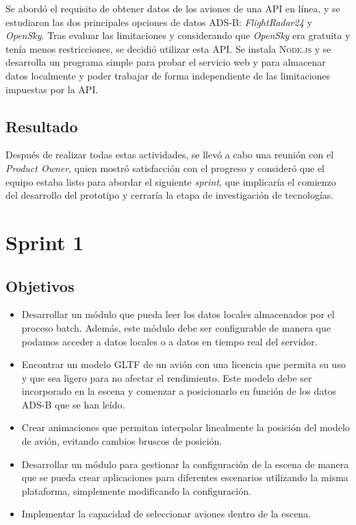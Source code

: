 \documentclass[a4paper, 11pt]{book}
\begin{document}
Se abordó el requisito de obtener datos de los aviones de una \textsc{API} en línea, y se estudiaron las dos principales opciones de datos \textsc{ADS-B}: \emph{FlightRadar24} y \emph{OpenSky}. Tras evaluar las limitaciones y considerando que \emph{OpenSky} era gratuita y tenía menos restricciones, se decidió utilizar esta \textsc{API}.
Se instala \textsc{Node.js} y se desarrolla un programa simple para probar el servicio web y para almacenar datos localmente y poder trabajar de forma independiente de las limitaciones impuestas por la \textsc{API}.
\subsection{Resultado}
Después de realizar todas estas actividades, se llevó a cabo una reunión con el \emph{Product Owner}, quien mostró satisfacción con el progreso y consideró que el equipo estaba listo para abordar el siguiente \emph{sprint}, que implicaría el comienzo del desarrollo del prototipo y cerraría la etapa de investigación de tecnologías.
\section{Sprint 1}
\subsection{Objetivos}
\begin{itemize}
    \item Desarrollar un módulo que pueda leer los datos locales almacenados por el proceso batch. Además, este módulo debe ser configurable de manera que podamos acceder a datos locales o a datos en tiempo real del servidor.
    \item Encontrar un modelo \textsc{GLTF} de un avión con una licencia que permita su uso y que sea ligero para no afectar el rendimiento. Este modelo debe ser incorporado en la escena y comenzar a posicionarlo en función de los datos \textsc{ADS-B} que se han leído.
    \item Crear animaciones que permitan interpolar linealmente la posición del modelo de avión, evitando cambios bruscos de posición.
    \item Desarrollar un módulo para gestionar la configuración de la escena de manera que se pueda crear aplicaciones para diferentes escenarios utilizando la misma plataforma, simplemente modificando la configuración.
    \item Implementar la capacidad de seleccionar aviones dentro de la escena.
\end{itemize}
\end{document}
